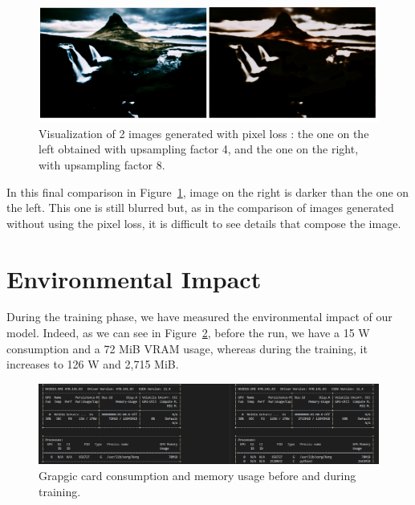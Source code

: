 \documentclass{article}
\begin{document}
{{        \begin{figure}[ht]
            \centering
            \includegraphics[height=0.2\textheight]{images/comparison_scaling_factor_with_pixel_loss.png}
            \caption{Visualization of 2 images generated with pixel loss : the one on the left obtained with upsampling factor 4, and the one on the right, with upsampling factor 8.}
            \label{fig:comparison_scaling_factor_with_pixel_loss}
        \end{figure}

        In this final comparison in Figure~\ref{fig:comparison_scaling_factor_with_pixel_loss}, image on the right is darker than the one on the left. This one is still blurred but, as in the comparison of images generated without using the pixel loss, it is difficult to see details that compose the image.
    }
}

{
    \section{Environmental Impact}
    \label{sec:env-impact}

    During the training phase, we have measured the environmental impact of our model. Indeed, as we can see in Figure~\ref{fig:impact}, before the run, we have a 15 W consumption and a 72 MiB VRAM usage, whereas during the training, it increases to 126 W and 2,715 MiB.

    \begin{figure}[ht]
        \centering
        \includegraphics[width=\textwidth]{images/impact.png}
        \caption{Grapgic card consumption and memory usage before and during training.}
        \label{fig:impact}
    \end{figure}
}
\end{document}
